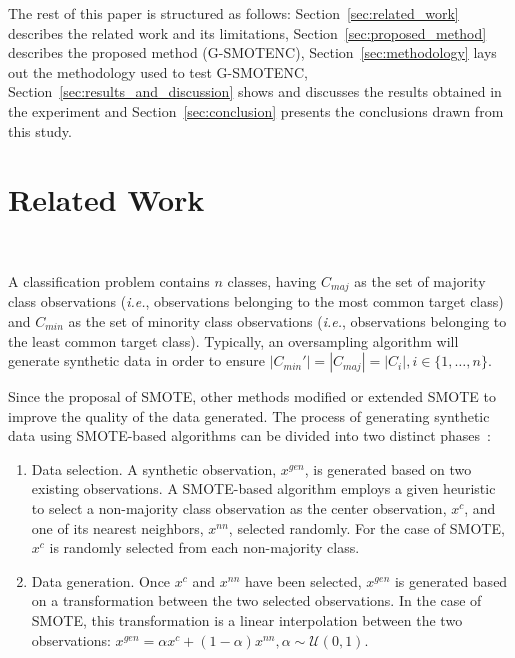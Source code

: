 \documentclass[preprint,12pt]{elsarticle}
\begin{document}
{%
The rest of this paper is structured as follows:
Section~\ref{sec:related_work} describes the related work and its limitations,
Section~\ref{sec:proposed_method} describes the proposed
method (G-SMOTENC), Section~\ref{sec:methodology} lays out the methodology
used to test G-SMOTENC, Section~\ref{sec:results_and_discussion} shows and
discusses the results obtained in the experiment and
Section~\ref{sec:conclusion} presents the conclusions drawn from this study.


\section{Related Work}~\label{sec:related_work}

A classification problem contains $n$ classes, having $C_{maj}$ as the set of
majority class observations (\textit{i.e.}, observations belonging to the most
common target class) and $C_{min}$ as the set of minority class observations
(\textit{i.e.}, observations belonging to the least common target class).
Typically, an oversampling algorithm will generate synthetic data in order to
ensure $|C_{min}'|=|C_{maj}|=|C_i|, i \in \{1, \ldots, n\}$.

Since the proposal of SMOTE, other methods modified or extended SMOTE to
improve the quality of the data generated. The process of generating synthetic
data using SMOTE-based algorithms can be divided into two distinct
phases~\cite{fernandez2018smote}:

\begin{enumerate}
    \item Data selection. A synthetic observation, $x^{gen}$, is generated
        based on two existing observations. A SMOTE-based algorithm employs a
        given heuristic to select a non-majority class observation as the
        center observation, $x^c$, and one of its nearest neighbors, $x^{nn}$,
        selected randomly. For the case of SMOTE, $x^c$ is randomly selected
        from each non-majority class.
    \item Data generation. Once $x^c$ and $x^{nn}$ have been selected, $x^{gen}$
        is generated based on a transformation between the two selected
        observations. In the case of SMOTE, this transformation is 
        a linear interpolation between the two observations: $x^{gen} = \alpha x^c
        + (1-\alpha) x^{nn}, \alpha \sim \mathcal{U}(0, 1)$.
\end{enumerate}

}
\end{document}
